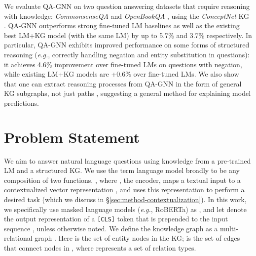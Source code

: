 \documentclass[11pt]{article}
\newcommand{\eg}{\textit{e.g.}}
\newcommand{\methodname}{QA-GNN\xspace}
\renewcommand\ttdefault{cmtt}
\begin{document}
We evaluate \methodname on two question answering datasets that require reasoning with knowledge: \textit{CommonsenseQA} \cite{talmor2018commonsenseqa} and \textit{OpenBookQA} \cite{obqa}, using the \textit{ConceptNet} KG \cite{speer2016conceptnet}. \methodname outperforms strong fine-tuned LM baselines as well as the existing best LM+KG model (with the same LM) by up to 5.7\% and 3.7\% respectively. In particular, \methodname exhibits improved performance on some forms of structured
reasoning (\eg, correctly handling negation and entity substitution in questions):
it achieves 4.6\% improvement over fine-tuned LMs on questions with negation, while existing LM+KG models are +0.6\% over fine-tuned LMs. 
We also show that one can extract reasoning processes from \methodname in the form of general KG subgraphs, not just paths \cite{lin2019kagnet}, suggesting a general method for explaining model predictions. \section{Problem Statement}\label{sec:setup}
\renewcommand\ttdefault{cmtt}
We aim to answer natural language questions using knowledge from a pre-trained LM and a structured KG.
We use the term language model broadly to be any composition of two functions, , where , the encoder, maps a textual input  to a contextualized vector representation , and  uses this representation to perform a desired task (which we discuss in \S\ref{sec:method-contextualization}). 
In this work, we specifically use masked language models (\eg, RoBERTa) as , and let  denote the output representation of a \texttt{[CLS]} token that is prepended to the input sequence , unless otherwise noted.
We define the knowledge graph as a multi-relational graph .
Here  is the set of entity nodes in the KG;   is the set of edges that connect nodes in , where  represents a set of relation types. 
\end{document}
